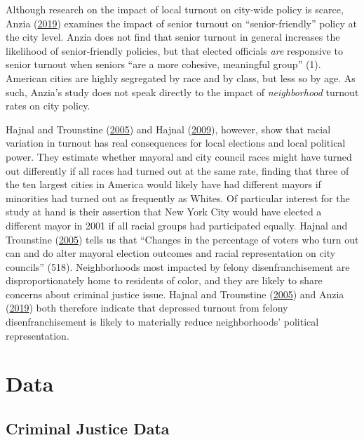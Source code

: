 \documentclass[12pt,]{article}
\begin{document}
Although research on the impact of local turnout on city-wide policy is scarce, Anzia (\protect\hyperlink{ref-Anzia2019}{2019}) examines the impact of senior turnout on ``senior-friendly'' policy at the city level. Anzia does not find that senior turnout in general increases the likelihood of senior-friendly policies, but that elected officials \emph{are} responsive to senior turnout when seniors ``are a more cohesive, meaningful group'' (1). American cities are highly segregated by race and by class, but less so by age. As such, Anzia's study does not speak directly to the impact of \emph{neighborhood} turnout rates on city policy.

Hajnal and Trounstine (\protect\hyperlink{ref-Hajnal2005}{2005}) and Hajnal (\protect\hyperlink{ref-Hajnal2009}{2009}), however, show that racial variation in turnout has real consequences for local elections and local political power. They estimate whether mayoral and city council races might have turned out differently if all races had turned out at the same rate, finding that three of the ten largest cities in America would likely have had different mayors if minorities had turned out as frequently as Whites. Of particular interest for the study at hand is their assertion that New York City would have elected a different mayor in 2001 if all racial groups had participated equally. Hajnal and Trounstine (\protect\hyperlink{ref-Hajnal2005}{2005}) tells us that ``Changes in the percentage of voters who turn out can and do alter mayoral election outcomes and racial representation on city councils'' (518). Neighborhoods most impacted by felony disenfranchisement are disproportionately home to residents of color, and they are likely to share concerns about criminal justice issue. Hajnal and Trounstine (\protect\hyperlink{ref-Hajnal2005}{2005}) and Anzia (\protect\hyperlink{ref-Anzia2019}{2019}) both therefore indicate that depressed turnout from felony disenfranchisement is likely to materially reduce neighborhoods' political representation.

\hypertarget{data}{%
\section*{Data}\label{data}}

\hypertarget{criminal-justice-data}{%
\subsection*{Criminal Justice Data}\label{criminal-justice-data}}
\end{document}
